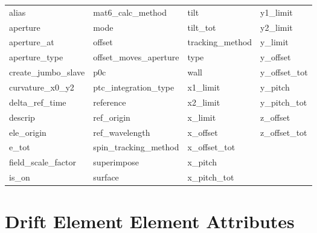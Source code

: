  \begin{tabular}{llll} \toprule
alias                       & mat6_calc_method            & tilt                        & y1_limit                    \\
aperture                    & mode                        & tilt_tot                    & y2_limit                    \\
aperture_at                 & offset                      & tracking_method             & y_limit                     \\
aperture_type               & offset_moves_aperture       & type                        & y_offset                    \\
create_jumbo_slave          & p0c                         & wall                        & y_offset_tot                \\
curvature_x0_y2             & ptc_integration_type        & x1_limit                    & y_pitch                     \\
delta_ref_time              & reference                   & x2_limit                    & y_pitch_tot                 \\
descrip                     & ref_origin                  & x_limit                     & z_offset                    \\
ele_origin                  & ref_wavelength              & x_offset                    & z_offset_tot                \\
e_tot                       & spin_tracking_method        & x_offset_tot                &                             \\
field_scale_factor          & superimpose                 & x_pitch                     &                             \\
is_on                       & surface                     & x_pitch_tot                 &                             \\
 \bottomrule
 \end{tabular}
 \vfill
 
 \section{Drift Element Element Attributes}
 \label{s:list.drift}
 
